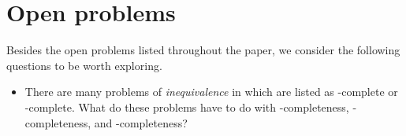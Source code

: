 \section{Open problems}

Besides the open problems listed throughout the paper, we consider the following questions to be worth exploring.
\begin{itemize}
\item There are many problems of \emph{inequivalence} in \cite{gj79} which are listed as \NP-complete or \PSPACE-complete.
  What do these problems have to do with \NPEq-completeness, \coNPEq-completeness, and \PSPACEEq-completeness?
\end{itemize}
